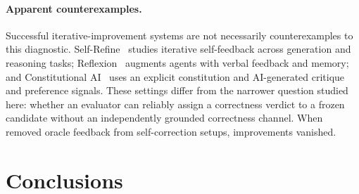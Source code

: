 \documentclass[a4paper,journal]{IAENGtran}
\begin{document}
\paragraph{Apparent counterexamples.} Successful iterative-improvement systems are
not necessarily counterexamples to this diagnostic. Self-Refine~\cite{madaan2023selfrefine}
studies iterative self-feedback across generation and reasoning tasks;
Reflexion~\cite{shinn2023reflexion} augments agents with verbal feedback and memory;
and Constitutional AI~\cite{bai2022constitutional} uses an explicit constitution and
AI-generated critique and preference signals. These settings differ from the narrower
question studied here: whether an evaluator can reliably assign a correctness verdict
to a frozen candidate without an independently grounded correctness channel. When
\cite{huang2024selfcorrect} removed oracle feedback from self-correction setups,
improvements vanished.

\section{Conclusions}
\end{document}
